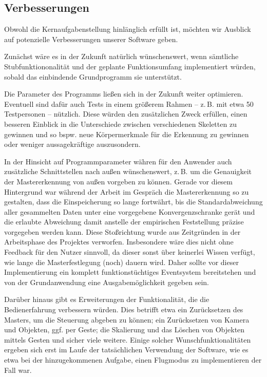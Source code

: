 \subsection{Verbesserungen}
Obwohl die Kernaufgabenstellung hinlänglich erfüllt ist, möchten wir Ausblick auf potenzielle Verbesserungen unserer Software geben.\par
Zunächst wäre es in der Zukunft natürlich wünschenswert, wenn sämtliche Stubfunktiononalität und der geplante Funktionsumfang implementiert würden, sobald das einbindende Grundprogramm sie unterstützt.\par 
Die Parameter des Programms ließen sich in der Zukunft weiter optimieren. Eventuell sind dafür auch Tests in einem größerem Rahmen -- z.\,B. mit etwa 50 Testpersonen -- nützlich. Diese würden den zusätzlichen Zweck erfüllen, einen besseren Einblick in die Unterschiede zwischen verschiedenen Skeletten zu gewinnen und so bspw. neue Körpermerkmale für die Erkennung zu gewinnen oder weniger aussagekräftige auszusondern.\par 
In der Hinsicht auf Programmparameter währen für den Anwender auch zusätzliche Schnittstellen nach außen wünschenswert, z.\,B. um die Genauigkeit der Mastererkennung von außen vorgeben zu können. Gerade vor diesem Hintergrund war während der Arbeit im Gespräch die Mastererkennung so zu gestalten, dass die Einspeicherung so lange fortwährt, bis die Standardabweichung aller gesammelten Daten unter eine vorgegebene Konvergenzschranke gerät und die erlaubte Abweichung damit anstelle der empirischen Feststellung präzise vorgegeben werden kann. Diese Stoßrichtung wurde aus Zeitgründen in der Arbeitsphase des Projektes verworfen. Insbesondere wäre dies nicht ohne Feedback für den Nutzer sinnvoll, da dieser sonst über keinerlei Wissen verfügt, wie lange die Masterfestlegung (noch) dauern wird. Daher sollte vor dieser Implementierung ein komplett funktionstüchtiges Eventsystem bereitstehen und von der Grundanwendung eine Ausgabemöglichkeit gegeben sein.\par 
Darüber hinaus gibt es Erweiterungen der Funktionalität, die die Bedienerfahrung verbessern würden. Dies betrifft etwa ein Zurücksetzen des Masters, um die Steuerung abgeben zu können; ein Zurücksetzen von Kamera und Objekten, ggf. per Geste; die Skalierung und das Löschen von Objekten mittels Gesten und sicher viele weitere. Einige solcher Wunschfunktionalitäten ergeben sich erst im Laufe der tatsächlichen Verwendung der Software, wie es etwa bei der hinzugekommenen Aufgabe, einen Flugmodus zu implementieren der Fall war.
%
